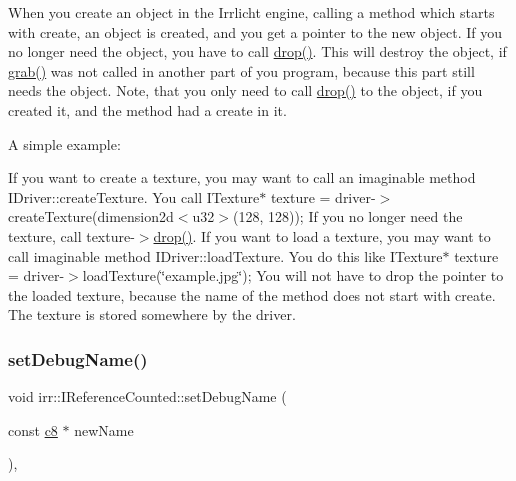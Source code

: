 When you create an object in the Irrlicht engine, calling a method which starts with \textquotesingle{}create\textquotesingle{}, an object is created, and you get a pointer to the new object. If you no longer need the object, you have to call \hyperlink{classirr_1_1IReferenceCounted_a03856a09355b89d178090c4a5f738543}{drop()}. This will destroy the object, if \hyperlink{classirr_1_1IReferenceCounted_a396f9cdbe311ada278626477b3c6f0f5}{grab()} was not called in another part of you program, because this part still needs the object. Note, that you only need to call \hyperlink{classirr_1_1IReferenceCounted_a03856a09355b89d178090c4a5f738543}{drop()} to the object, if you created it, and the method had a \textquotesingle{}create\textquotesingle{} in it.

A simple example\+:

If you want to create a texture, you may want to call an imaginable method I\+Driver\+::create\+Texture. You call I\+Texture$\ast$ texture = driver-\/$>$create\+Texture(dimension2d$<$u32$>$(128, 128)); If you no longer need the texture, call texture-\/$>$\hyperlink{classirr_1_1IReferenceCounted_a03856a09355b89d178090c4a5f738543}{drop()}. If you want to load a texture, you may want to call imaginable method I\+Driver\+::load\+Texture. You do this like I\+Texture$\ast$ texture = driver-\/$>$load\+Texture(\char`\"{}example.\+jpg\char`\"{}); You will not have to drop the pointer to the loaded texture, because the name of the method does not start with \textquotesingle{}create\textquotesingle{}. The texture is stored somewhere by the driver. \mbox{\label{classirr_1_1IReferenceCounted_a704c5042d399fe8cd3bdd65a0559002a}} 
\subsubsection{\texorpdfstring{set\+Debug\+Name()}{setDebugName()}}
{\footnotesize\ttfamily void irr\+::\+I\+Reference\+Counted\+::set\+Debug\+Name (\begin{DoxyParamCaption}\item[{const \hyperlink{namespaceirr_a9395eaea339bcb546b319e9c96bf7410}{c8} $\ast$}]{new\+Name }\end{DoxyParamCaption})\hspace{0.3cm}{\ttfamily [inline]}, {\ttfamily [protected]}}



